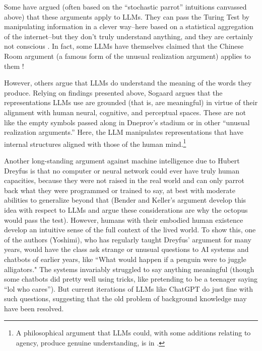 Some have argued (often based on the ``stochastic parrot'' intuitions canvassed above) that these arguments apply to LLMs. They can pass the Turing Test by manipulating information in a clever way--here based on a statistical aggregation of the internet--but they don't truly understand anything, and they are certainly not conscious \cite{hamid2023chatgpt}. In fact, some LLMs have themselves claimed that the Chinese Room argument (a famous form of the unusual realization argument) applies to them \cite{sep-chinese-room}! 

However, others argue that LLMs do understand the meaning of the words they produce. Relying on findings presented above, Sogaard \cite{sogaard2023grounding} argues that the representations LLMs use are grounded (that is, are meaningful) in virtue of their alignment with human neural, cognitive, and perceptual spaces. These are not like the empty symbols passed along in Dneprov's stadium or in other ``unusual realization arguments.'' Here, the LLM manipulates representations that have internal structures aligned with those of the human mind.\footnote{A philosophical argument that LLMs could, with some additions relating to agency, produce genuine understanding, is in \cite{borg2025llms}.} 

Another long-standing argument against machine intelligence due to Hubert Dreyfus \cite{dreyfus1992computers} is that no computer or neural network could ever have truly human capacities, because they were not raised in the real world and can only parrot back what they were programmed or trained to say, at best with moderate abilities to generalize beyond that (Bender and Keller's argument develop this idea with respect to LLMs and argue these considerations are why the octopus would pass the test). However, humans with their embodied human existence develop an intuitive sense of the full context of the lived world. To show this, one of the authors (Yoshimi), who has regularly taught Dreyfus'  argument for many years, would have the class ask strange or unusual questions to AI systems and chatbots of earlier years, like ``What would happen if a penguin were to juggle alligators." The systems invariably struggled to say anything meaningful (though some chatbots did pretty well using tricks, like pretending to be a teenager saying ``lol who cares''). But current iterations of LLMs like ChatGPT do just fine with such questions, suggesting that the old problem of background knowledge may have been resolved. 

